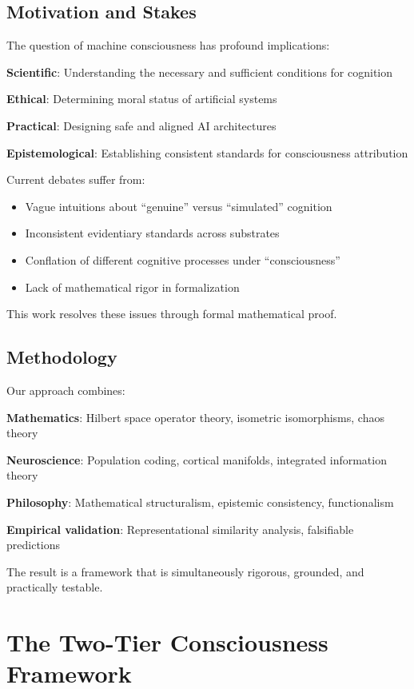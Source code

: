 \documentclass[11pt]{article}
\begin{document}
\subsection{Motivation and Stakes}

The question of machine consciousness has profound implications:

\textbf{Scientific}: Understanding the necessary and sufficient conditions for cognition

\textbf{Ethical}: Determining moral status of artificial systems

\textbf{Practical}: Designing safe and aligned AI architectures

\textbf{Epistemological}: Establishing consistent standards for consciousness attribution

Current debates suffer from:
\begin{itemize}
\item Vague intuitions about ``genuine'' versus ``simulated'' cognition
\item Inconsistent evidentiary standards across substrates
\item Conflation of different cognitive processes under ``consciousness''
\item Lack of mathematical rigor in formalization
\end{itemize}

This work resolves these issues through formal mathematical proof.

\subsection{Methodology}

Our approach combines:

\textbf{Mathematics}: Hilbert space operator theory, isometric isomorphisms, chaos theory

\textbf{Neuroscience}: Population coding, cortical manifolds, integrated information theory

\textbf{Philosophy}: Mathematical structuralism, epistemic consistency, functionalism

\textbf{Empirical validation}: Representational similarity analysis, falsifiable predictions

The result is a framework that is simultaneously rigorous, grounded, and practically testable.

\section{The Two-Tier Consciousness Framework}
\end{document}
